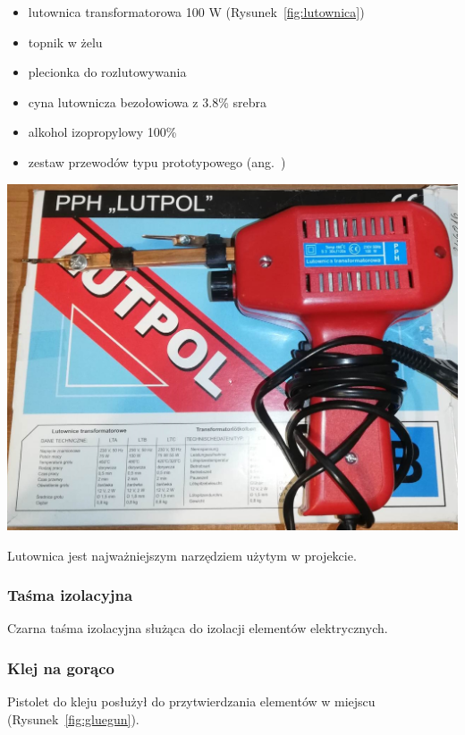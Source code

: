 \begin{itemize}
    \item lutownica transformatorowa 100 W (Rysunek~\ref{fig:lutownica})
    \item topnik w żelu
    \item plecionka do rozlutowywania
    \item cyna lutownicza bezołowiowa z 3.8\% srebra
    \item alkohol izopropylowy 100\%
    \item zestaw przewodów typu prototypowego (ang.~)
\end{itemize}

\begin{center}
    \includegraphics[scale=0.28]{images/lutownica.jpg}
    \label{fig:lutownica}
\end{center}

Lutownica jest najważniejszym narzędziem użytym w projekcie.

\subsubsection*{Taśma izolacyjna}
Czarna taśma izolacyjna służąca do izolacji elementów elektrycznych.

\subsubsection*{Klej na gorąco}
Pistolet do kleju posłużył do przytwierdzania elementów w miejscu (Rysunek~\ref{fig:gluegun}).

